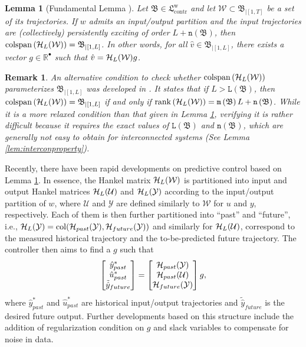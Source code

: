\documentclass[11pt,print,draftcls,onecolumn,romanappendices]{ieeecolor}
\newtheorem{lem}[thm]{Lemma}
\newtheorem{rem}{Remark}
\DeclareMathOperator{\col}{col}
\DeclareMathOperator{\cs}{colspan}
\DeclareMathOperator{\rank}{rank}
\newcommand{\R}{\mathbb{R}}
\newcommand{\LTI}[1]{\mathfrak{L}^{#1}}
\newcommand{\n}[1]{\mathtt{n}\left(#1\right)}
\newcommand{\lag}[1]{\mathtt{L}\left(#1\right)}
\newcommand{\revise}[1]{{\color{black} #1}}
\newcommand{\B}{\mathfrak{B}}
\newcommand{\Hk}{\mathcal{H}}
\newcommand{\bint}[1]{{|[#1]}}
\begin{document}
\begin{lem}[Fundamental Lemma \cite{Willems:2005,vanWaarde:2020}]\label{lem:behaviorpara}
	\revise{Let $\B\in\LTI{\mathrm{w}}_\mathrm{contr}$ and let $\mathcal{W}\subset\B_{|[1,T]}$ be a set of its trajectories. If $w$ admits an input/output partition and the input trajectories are (collectively) persistently exciting of order $L+\n{\B}$}, then $\cs\left(\Hk_L(\revise{\mathcal{W}})\right)=\B_{|[1,L]}$. In other words, for all $\hat{v}\in\B_\bint{1,L}$, there exists a vector $g\in\R^\bullet$ such that $\hat{v}=\Hk_L(\revise{\mathcal{W}})g$.
\end{lem}
\begin{rem}
		An alternative condition to check whether $\cs\left(\Hk_L(\revise{\mathcal{W}})\right)$ parameterizes $\B_{|[1,L]}$ was developed in \cite{Markovsky:2020}. It states that if $L>\lag{\B}$, then $\cs\left(\Hk_L(\revise{\mathcal{W}})\right)=\B_{|[1,L]}$ if and only if $\rank\left(\Hk_L(\revise{\mathcal{W}})\right)=\mathtt{m}\left(\B\right)L+\n{\B}$. While it is a more relaxed condition than that given in Lemma \ref{lem:behaviorpara}, verifying it is rather difficult because it requires the exact values of $\lag{\B}$ and $\n{\B}$, which are generally not easy to obtain for interconnected systems (See Lemma \ref{lem:interconproperty}).
\end{rem}

Recently, there have been rapid developments on predictive control based on Lemma \ref{lem:behaviorpara}. In essence, the Hankel matrix $\Hk_L(\revise{\mathcal{W}})$ is partitioned into input and output Hankel matrices $\Hk_L(\revise{\mathcal{U}})$ and $\Hk_L(\revise{\mathcal{Y}})$ according to the input/output partition of $w$, \revise{where $\mathcal{U}$ and $\mathcal{Y}$ are defined similarly to $\mathcal{W}$ for $u$ and $y$, respectively}. Each of them is then further partitioned into ``past'' and ``future'', i.e., $\Hk_L(\revise{\mathcal{Y}})=\col(\Hk_{past}(\revise{\mathcal{Y}}),\Hk_{future}(\revise{\mathcal{Y}}))$ and similarly for $\Hk_L(\revise{\mathcal{U}})$, correspond to the measured historical trajectory and the to-be-predicted future trajectory. The controller then aims to find a $g$ such that \cite{Markovsky:2008}
\begin{equation}\label{eq:DPC}
    \begin{bmatrix}
        \hat{y}_{past}^*\\ \hat{u}_{past}^* \\ \tilde{\hat{y}}_{future}
    \end{bmatrix}=\begin{bmatrix}
        \Hk_{past}(\revise{\mathcal{Y}}) \\\Hk_{past}(\revise{\mathcal{U}}) \\ \Hk_{future}(\revise{\mathcal{Y}})
    \end{bmatrix}g,
\end{equation}
where $\hat{y}_{past}^*$ and $\hat{u}_{past}^*$ are historical input/output trajectories and $\tilde{\hat{y}}_{future}$ is the desired future output. Further developments based on this structure include the addition of regularization condition on $g$ \cite{Coulson:2019} and slack variables \cite{Berberich:2020a} to compensate for noise in data.
\end{document}
